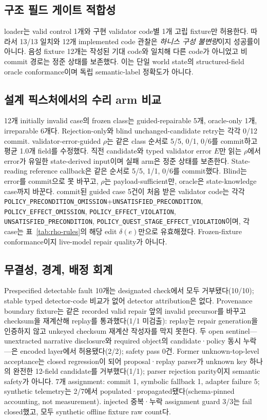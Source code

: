 \subsection{구조 필드 게이트 적합성}
loader는 valid control 1개와 구현 validator code별 1개 고립 fixture만 허용한다. 따라서 13/13 일치와 12개 implemented code 관찰은 \emph{하니스 구성 불변량}이지 성공률이 아니다. 음성 fixture 12개는 작성된 기대 code와 일치해 다른 code가 아니었고 비commit 경로는 정준 상태를 보존했다. 이는 단일 world state의 structured-field oracle conformance이며 독립 semantic-label 정확도가 아니다.

\subsection{설계 픽스처에서의 수리 arm 비교}
12개 initially invalid case의 frozen class는 guided-repairable 5개, oracle-only 1개, irreparable 6개다. Rejection-only와 blind unchanged-candidate retry는 각각 0/12 commit. validator-error-guided $\rho$는 같은 class 순서로 5/5, 0/1, 0/6를 commit하고 평균 1.0개 field를 수정했다. 직전 candidate와 typed validator error $E$만 읽는 $\rho$에서 error가 유일한 state-derived input이며 실패 arm은 정준 상태를 보존한다. State-reading reference callback은 같은 순서로 5/5, 1/1, 0/6를 commit했다. Blind는 error를 commit으로 못 바꾸고, $\rho$는 payload-sufficient만, oracle은 state-knowledge case까지 바꾼다. commit된 guided case 5건이 처음 받은 validator code는 각각 \texttt{POLICY\_\allowbreak{}PRECONDITION\_\allowbreak{}OMISSION}+\texttt{UNSATISFIED\_\allowbreak{}PRECONDITION}, \texttt{POLICY\_\allowbreak{}EFFECT\_\allowbreak{}OMISSION}, \texttt{POLICY\_\allowbreak{}EFFECT\_\allowbreak{}VIOLATION}, \texttt{UNSATISFIED\_\allowbreak{}PRECONDITION}, \texttt{POLICY\_\allowbreak{}QUEST\_\allowbreak{}STAGE\_\allowbreak{}EFFECT\_\allowbreak{}VIOLATION}이며, 각 case는 표~\ref{tab:rho-rules}의 해당 edit $\delta(e)$만으로 유효해졌다. Frozen-fixture conformance이지 live-model repair quality가 아니다.

\subsection{무결성, 경계, 배정 회계}
Prespecified detectable fault 10개는 designated check에서 모두 거부됐다(10/10); stable typed detector-code 비교가 없어 detector attribution은 없다. Provenance boundary fixture는 같은 recorded valid repair 앞의 invalid precursor를 바꾸고 checksum을 재계산해 replay를 통과했다(1/1 미검출): replay는 repair generation을 인증하지 않고 unkeyed checksum 재계산 작성자를 막지 못한다. 두 open sentinel---unextracted narrative disclosure와 required object의 candidate·policy 동시 누락---은 encoded layer에서 허용됐다(2/2); safety pass 0건. Former unknown-top-level acceptance는 closed regression이 되어 proposal·replay parser가 unknown key 하나의 완전한 12-field candidate를 거부했다(1/1); parser rejection parity이지 semantic safety가 아니다. 7개 assignment: commit 1, symbolic fallback 1, adapter failure 5; synthetic telemetry는 2/7에서 populated·propagated됐다(schema-pinned accounting, not measurement). injected 중복·누락 assignment guard 3/3는 fail closed했고, 모두 synthetic offline fixture raw count다.
